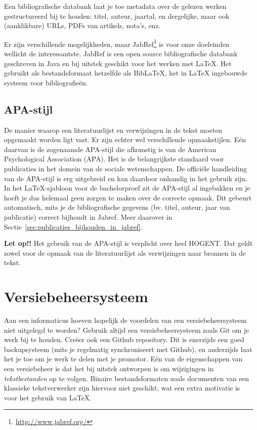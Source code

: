 Een bibliografische databank laat je toe metadata over de gelezen werken gestructureerd bij te houden: titel, auteur, jaartal, en dergelijke, maar ook (aanklikbare) URLs, PDFs van artikels, nota's, enz.

Er zijn verschillende mogelijkheden, maar JabRef\footnote{\url{http://www.jabref.org/}} is voor onze doeleinden wellicht de interessantste. JabRef is een open source bibliografische databank geschreven in Java en bij uitstek geschikt voor het werken met {\LaTeX}. Het gebruikt als bestandsformaat hetzelfde als Bib{\LaTeX}, het in {\LaTeX} ingebouwde systeem voor bibliografieën.

\subsection{APA-stijl}

De manier waarop een literatuurlijst en verwijzingen in de tekst moeten opgemaakt worden ligt vast. Er zijn echter wel verschillende opmaakstijlen. Eén daarvan is de zogenaamde APA-stijl die afkomstig is van de American Psychological Association (APA). Het is de belangrijkste standaard voor publicaties in het domein van de sociale wetenschappen. De officiële handleiding van de APA-stijl is erg uitgebreid en kan daardoor onhandig in het gebruik zijn. In het {\LaTeX}-sjabloon voor de bachelorproef zit de APA-stijl al ingebakken en je hoeft je dus helemaal geen zorgen te maken over de correcte opmaak. Dit gebeurt automatisch, mits je de bibliografische gegevens (bv. titel, auteur, jaar van publicatie) correct bijhoudt in Jabref. Meer daarover in Sectie~\ref{sec:publicaties_bijhouden_in_jabref}.

\textbf{Let op!!} Het gebruik van de APA-stijl is verplicht over heel HOGENT. Dat geldt zowel voor de opmaak van de literatuurlijst als verwijzingen naar bronnen in de tekst.

\section{Versiebeheersysteem}
\label{sec:versiebeheersysteem}

Aan een informaticus hoeven hopelijk de voordelen van een versiebeheersysteem niet uitgelegd te worden? Gebruik altijd een versiebeheersysteem zoals Git om je werk bij te houden. Creëer ook een Github repository. Dit is enerzijds een goed backupsysteem (mits je regelmatig synchroniseert met Github), en anderzijds laat het je toe om je werk te delen met je promotor. Eén van de eigenschappen van een versiebeheer is dat het bij uitstek ontworpen is om wijzigingen in \emph{tekstbestanden} op te volgen. Binaire bestandsformaten zoals documenten van een klassieke tekstverwerker zijn hiervoor niet geschikt, wat een extra motivatie is voor het gebruik van \LaTeX{}.

